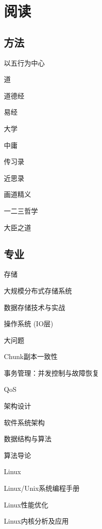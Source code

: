 \chapter{阅读}

\section{方法}

以五行为中心

道
\begin{enumbox}
\item 道德经
\item 易经
\item 大学
\item 中庸
\item 传习录
\item 近思录
\item 画道精义
\item 一二三哲学
\item 大臣之道
\end{enumbox}

\section{专业}

存储
\begin{enumbox}
\item 大规模分布式存储系统
\item 数据存储技术与实战
\item 操作系统 (IO层)
\end{enumbox}

大问题
\begin{enumbox}
\item Chunk副本一致性
\item 事务管理：并发控制与故障恢复
\item QoS
\end{enumbox}

架构设计
\begin{enumbox}
\item 软件系统架构
\end{enumbox}

数据结构与算法
\begin{enumbox}
\item 算法导论
\end{enumbox}

Linux
\begin{enumbox}
\item Linux/Unix系统编程手册
\item Linux性能优化
\item Linux内核分析及应用
\end{enumbox}

